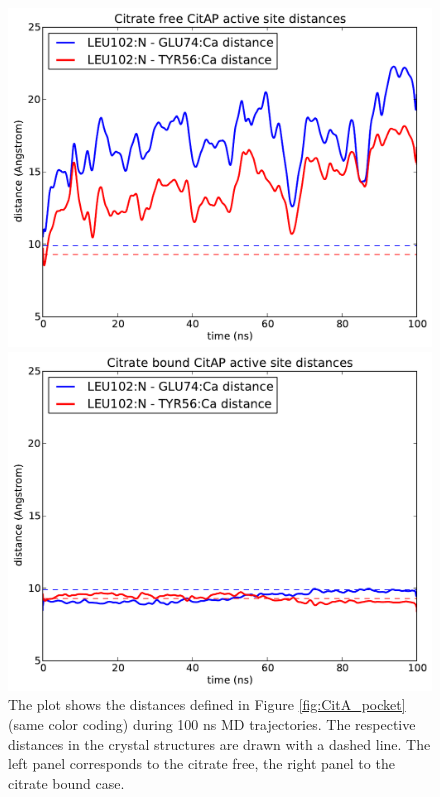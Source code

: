 \documentclass[english, a4paper, 12pt, titlepage, draft]{article}
\begin{document}
\begin{figure}
    \begin{minipage}[]{0.45\linewidth}
        \centering
        \includegraphics[width=1.0\textwidth]{figures/CitAP_opening/CitAP_dist_free.pdf}
    \end{minipage}
\hspace{0.5cm}
    \begin{minipage}[]{0.45\linewidth}
        \centering
        \includegraphics[width=1.0\textwidth]{figures/CitAP_opening/CitAP_dist_bound.pdf}
    \end{minipage}
    \caption{The plot shows the distances defined in Figure \ref{fig:CitA_pocket} (same color coding) during 100 ns MD trajectories. The respective distances in the crystal structures are drawn with a dashed line. The left panel corresponds to the citrate free, the right panel to the citrate bound case.}
\label{fig:CitA_opening_distances}
\end{figure}        
\end{document}
